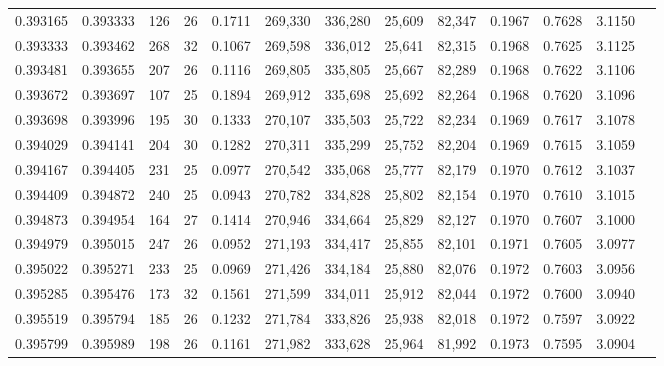 \begin{tabular}{rrrrrrrrrrrrr}
0.393165 & 0.393333 &    126 &    26 &                                     0.1711 & 269,330 & 336,280 &  25,609 &  82,347 & 0.1967 & 0.7628 & 3.1150 \\
0.393333 & 0.393462 &    268 &    32 &                                     0.1067 & 269,598 & 336,012 &  25,641 &  82,315 & 0.1968 & 0.7625 & 3.1125 \\
0.393481 & 0.393655 &    207 &    26 &                                     0.1116 & 269,805 & 335,805 &  25,667 &  82,289 & 0.1968 & 0.7622 & 3.1106 \\
0.393672 & 0.393697 &    107 &    25 &                                     0.1894 & 269,912 & 335,698 &  25,692 &  82,264 & 0.1968 & 0.7620 & 3.1096 \\
0.393698 & 0.393996 &    195 &    30 &                                     0.1333 & 270,107 & 335,503 &  25,722 &  82,234 & 0.1969 & 0.7617 & 3.1078 \\
0.394029 & 0.394141 &    204 &    30 &                                     0.1282 & 270,311 & 335,299 &  25,752 &  82,204 & 0.1969 & 0.7615 & 3.1059 \\
0.394167 & 0.394405 &    231 &    25 &                                     0.0977 & 270,542 & 335,068 &  25,777 &  82,179 & 0.1970 & 0.7612 & 3.1037 \\
0.394409 & 0.394872 &    240 &    25 &                                     0.0943 & 270,782 & 334,828 &  25,802 &  82,154 & 0.1970 & 0.7610 & 3.1015 \\
0.394873 & 0.394954 &    164 &    27 &                                     0.1414 & 270,946 & 334,664 &  25,829 &  82,127 & 0.1970 & 0.7607 & 3.1000 \\
0.394979 & 0.395015 &    247 &    26 &                                     0.0952 & 271,193 & 334,417 &  25,855 &  82,101 & 0.1971 & 0.7605 & 3.0977 \\
0.395022 & 0.395271 &    233 &    25 &                                     0.0969 & 271,426 & 334,184 &  25,880 &  82,076 & 0.1972 & 0.7603 & 3.0956 \\
0.395285 & 0.395476 &    173 &    32 &                                     0.1561 & 271,599 & 334,011 &  25,912 &  82,044 & 0.1972 & 0.7600 & 3.0940 \\
0.395519 & 0.395794 &    185 &    26 &                                     0.1232 & 271,784 & 333,826 &  25,938 &  82,018 & 0.1972 & 0.7597 & 3.0922 \\
0.395799 & 0.395989 &    198 &    26 &                                     0.1161 & 271,982 & 333,628 &  25,964 &  81,992 & 0.1973 & 0.7595 & 3.0904 \\

\end{tabular}

